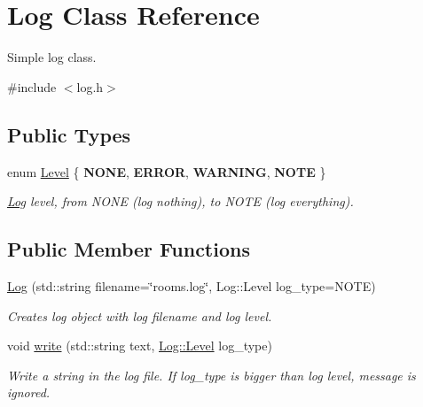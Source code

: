 \hypertarget{classLog}{
\section{Log Class Reference}
\label{classLog}
}


Simple log class.  




{\ttfamily \#include $<$log.h$>$}

\subsection*{Public Types}
\begin{DoxyCompactItemize}
\item 
enum \hyperlink{classLog_afb5d4c945d835d194a295461d752531e}{Level} \{ {\bfseries NONE}, 
{\bfseries ERROR}, 
{\bfseries WARNING}, 
{\bfseries NOTE}
 \}
\begin{DoxyCompactList}\small\item\em \hyperlink{classLog}{Log} level, from NONE (log nothing), to NOTE (log everything). \item\end{DoxyCompactList}\end{DoxyCompactItemize}
\subsection*{Public Member Functions}
\begin{DoxyCompactItemize}
\item 
\hypertarget{classLog_a1a4d42345af99eaad57f38dbe826bbd8}{
\hyperlink{classLog_a1a4d42345af99eaad57f38dbe826bbd8}{Log} (std::string filename=\char`\"{}rooms.log\char`\"{}, Log::Level log\_\-type=NOTE)}
\label{classLog_a1a4d42345af99eaad57f38dbe826bbd8}

\begin{DoxyCompactList}\small\item\em Creates log object with log filename and log level. \item\end{DoxyCompactList}\item 
\hypertarget{classLog_a1229f97545eb3361fd9e6bbdd1d61494}{
void \hyperlink{classLog_a1229f97545eb3361fd9e6bbdd1d61494}{write} (std::string text, \hyperlink{classLog_afb5d4c945d835d194a295461d752531e}{Log::Level} log\_\-type)}
\label{classLog_a1229f97545eb3361fd9e6bbdd1d61494}

\begin{DoxyCompactList}\small\item\em Write a string in the log file. If log\_\-type is bigger than log level, message is ignored. \item\end{DoxyCompactList}\end{DoxyCompactItemize}


